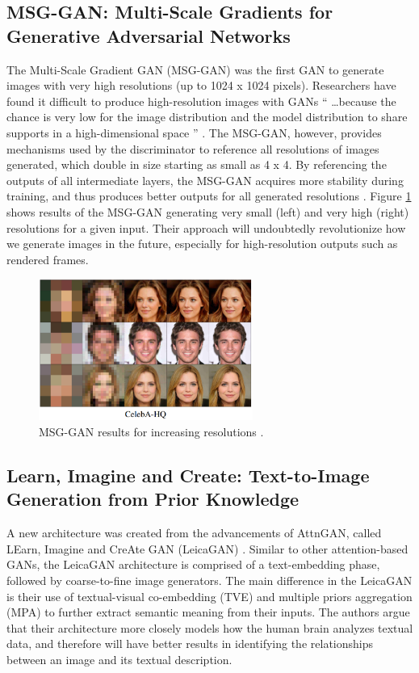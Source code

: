 \documentclass[letterpaper]{article} %
\begin{document}
\subsection{MSG-GAN: Multi-Scale Gradients for Generative Adversarial
Networks}
\label{subsec:msg-gan}
The Multi-Scale Gradient GAN (MSG-GAN) was the first GAN to generate images 
with very high resolutions (up to 1024 x 1024 pixels).
Researchers have found it difficult to produce high-resolution images with GANs
``
\dots because the chance is
very low for the image distribution and the model distribution
to share supports in a high-dimensional space
'' \cite{stackgan++}.
The MSG-GAN, however, provides mechanisms used by the discriminator to 
reference all resolutions of images generated, which double in size starting as 
small as 4 x 4. By referencing the outputs of all intermediate layers, the 
MSG-GAN acquires more stability during training, and thus produces better 
outputs for all generated resolutions
\cite{msggan}. Figure \ref{fig:msggan} shows results of the MSG-GAN generating 
very small (left) and very high (right) resolutions for a given input.
Their approach will undoubtedly revolutionize how we generate images in the 
future, especially for high-resolution outputs such as rendered frames.

\begin{figure}[htbp]
\centerline{\includegraphics[width=7cm]{msggan.png}}
\caption{MSG-GAN results for increasing resolutions
\cite{msggan}.}
\label{fig:msggan}
\end{figure}

\subsection{Learn, Imagine and Create: Text-to-Image Generation from Prior 
Knowledge}
\label{subsec:leica}
A new architecture was created from the advancements of AttnGAN, called LEarn, 
Imagine and CreAte GAN (LeicaGAN) \cite{leica}. Similar to other 
attention-based GANs, the LeicaGAN architecture is comprised of a 
text-embedding phase, followed by coarse-to-fine image generators. The main 
difference in the LeicaGAN is their use of textual-visual co-embedding (TVE) 
and multiple priors aggregation (MPA) to further extract semantic meaning from 
their inputs. The authors argue that their architecture more closely models how 
the human brain analyzes textual data, and therefore will have better results 
in identifying the relationships between an image and its textual description.
\end{document}
